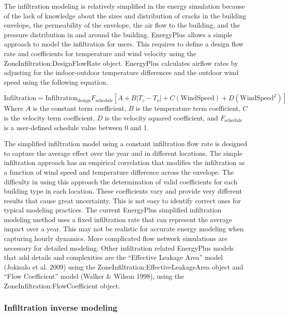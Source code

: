 \documentclass[11pt]{article}
\begin{document}
The infiltration modeling is relatively simplified in the energy simulation because of the lack of knowledge about the sizes and distribution of cracks in the building envelope, the permeability of the envelope, the air flow to the building, and the pressure distribution in and around the building. EnergyPlus allows a simple approach to model the infiltration for users. This requires to define a design flow rate and coefficients for temperature and wind velocity using the ZoneInfiltration:DesignFlowRate object. EnergyPlus calculates airflow rates by adjusting for the indoor-outdoor temperature differences and the outdoor wind speed using the following equation.

\begin{equation}
\text{Infiltration} = \text{Infiltration}_\text{design} F_\text{schedule} \left[A+B|T_z -T_o|+C (\text{WindSpeed})+D(\text{WindSpeed}^2 )\right]
\end{equation}
Where $A$ is the constant term coefficient, $B$ is the temperature term coefficient, $C$ is the velocity term coefficient, $D$ is the velocity squared coefficient, and $F_\text{schedule}$ is a user-defined schedule value between 0 and 1.

The simplified infiltration model using a constant infiltration flow rate is designed to capture the average effect over the year and in different locations. The simple infiltration approach has an empirical correlation that modifies the infiltration as a function of wind speed and temperature difference across the envelope. The difficulty in using this approach the determination of valid coefficients for each building type in each location. These coefficients vary and provide very different results that cause great uncertainty. This is not easy to identify correct ones for typical modeling practices. The current EnergyPlus simplified infiltration modeling method uses a fixed infiltration rate that can represent the average impact over a year. This may not be realistic for accurate energy modeling when capturing hourly dynamics. More complicated flow network simulations are necessary for detailed modeling. Other infiltration related EnergyPlus models that add details and complexities are the ``Effective Leakage Area'' model (Jokisalo et al. 2009) using the ZoneInfiltration:EffectiveLeakageArea object  and ``Flow Coefficient'' model (Walker \& Wilson 1998), using the ZoneInfiltration:FlowCoefficient object.

\subsubsection{Infiltration inverse modeling}\label{Infiltration inverse modeling}
\end{document}
